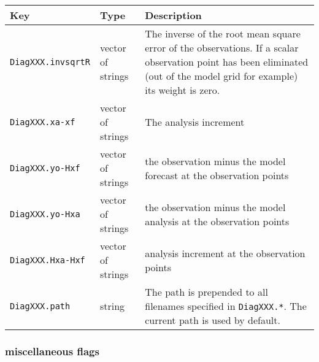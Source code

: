\documentclass[a4paper,12pt]{article}
\newcommand{\code}{\texttt}
\newenvironment{keytabular}{\begin{tabular}{|p{0.3\textwidth}|p{0.2\textwidth}|p{0.5\textwidth}|} \hline Key & Type & Description \\ \hline \hline }{\end{tabular}}
\begin{document}
\begin{keytabular}
\code{DiagXXX.invsqrtR} & vector of strings & The inverse of the root mean
square error of the observations. If a scalar observation point has
been eliminated (out of the model grid for example) its weight is zero.
\\
\code{DiagXXX.xa-xf} & vector of strings & The analysis increment
\\
\code{DiagXXX.yo-Hxf} & vector of strings & the observation minus the
model forecast at the observation points
\\
\code{DiagXXX.yo-Hxa} & vector of strings & the observation minus the
model analysis at the observation points
\\
\code{DiagXXX.Hxa-Hxf} & vector of strings & analysis increment 
at the observation points
\\
\code{DiagXXX.path} & string & The path is prepended to all filenames
specified in \code{DiagXXX.*}. The current path is used by default.
\\
\hline
\end{keytabular}

\subsubsection{miscellaneous flags}
\end{document}
